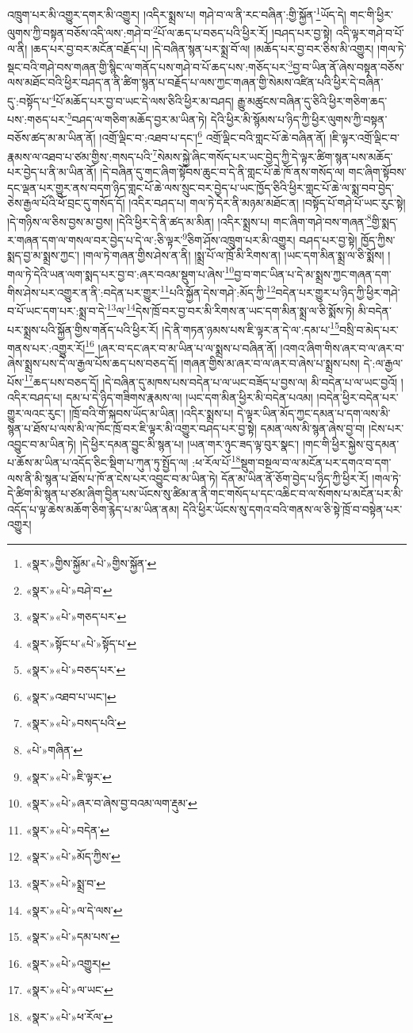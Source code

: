 འཁྲུག་པར་མི་འགྱུར་དགར་མི་འགྱུར། །འདིར་སྨྲས་པ། གཤེ་བ་ལ་ནི་རང་བཞིན་:གྱི་སྐྱོན་\footnote{«སྣར་»གྱིས་སྐྱོམ་«པེ་»གྱིས་སྐྱོན་}ཡོད་དེ། གང་གི་ཕྱིར་ལུགས་ཀྱི་བསྟན་བཅོས་འདི་ལས་:གཤེ་བ་\footnote{«སྣར་»«པེ་»བཤེ་བ་}པོ་ལ་ཆད་པ་བཅད་པའི་ཕྱིར་རོ། །བཤད་པར་བྱ་སྟེ། འདི་ལྟར་གཤེ་བ་པོ་ལ་ནི། །ཆད་པར་བྱ་བར་མངོན་བརྗོད་པ། །དེ་བཞིན་སྙན་པར་སྨྲ་བོ་ལ། །མཆོད་པར་བྱ་བར་ཅིས་མི་འགྱུར། །གལ་ཏེ་སྡང་བའི་གཤེ་བས་གཞན་གྱི་སྙིང་ལ་གནོད་པས་གཤེ་བ་པོ་ཆད་པས་:གཅོད་པར་\footnote{«སྣར་»«པེ་»གཅད་པར་}བྱ་བ་ཡིན་ནོ་ཞེས་བསྟན་བཅོས་ལས་མཐོང་བའི་ཕྱིར་བཤད་ན་ནི་ཚིག་སྙན་པ་བརྗོད་པ་ལས་ཀྱང་གཞན་གྱི་སེམས་འཛིན་པའི་ཕྱིར་དེ་བཞིན་དུ་:བསྟོད་པ་\footnote{«སྣར་»སྟོང་པ་«པེ་»སྟོད་པ་}པོ་མཆོད་པར་བྱ་བ་ཡང་དེ་ལས་ཅིའི་ཕྱིར་མ་བཤད། རྒྱུ་མཚུངས་བཞིན་དུ་ཅིའི་ཕྱིར་གཅིག་ཆད་པས་:གཅད་པར་\footnote{«སྣར་»«པེ་»བཅད་པར་}བཤད་ལ་གཅིག་མཆོད་བྱར་མ་ཡིན་ཏེ། དེའི་ཕྱིར་མི་སྙོམས་པ་ཉིད་ཀྱི་ཕྱིར་ལུགས་ཀྱི་བསྟན་བཅོས་ཚད་མ་མ་ཡིན་ནོ། །འགྲོ་ལྡིང་བ་:འཐབ་པ་དང་།\footnote{«སྣར་»འཐབ་པ་ཡང་།} འགྲོ་ལྡིང་བའི་གླང་པོ་ཆེ་བཞིན་ནོ། །ཇི་ལྟར་འགྲོ་ལྡིང་བ་རྣམས་ལ་འཐབ་པ་ཙམ་གྱིས་:གསད་པའི་\footnote{«སྣར་»«པེ་»བསད་པའི་}སེམས་སྐྱེ་ཞིང་གསོད་པར་ཡང་བྱེད་ཀྱི་དེ་ལྟར་ཚིག་སྙན་པས་མཆོད་པར་བྱེད་པ་ནི་མ་ཡིན་ནོ། །དེ་བཞིན་དུ་གང་ཞིག་སྟོབས་ཆུང་བ་དེ་ནི་གླང་པོ་ཆེ་ཁོ་ནས་གསོད་ལ། གང་ཞིག་སྟོབས་དང་ལྡན་པར་གྱུར་ནས་བདག་ཉིད་གླང་པོ་ཆེ་ལས་སྲུང་བར་བྱེད་པ་ཡང་ཁྱོད་ཅིའི་ཕྱིར་གླང་པོ་ཆེ་ལ་སྨ་བབ་བྱེད་ཅེས་རྒྱལ་པོའི་ཕོ་བྲང་དུ་གསོད་དོ། །འདིར་བཤད་པ། གལ་ཏེ་དེར་ནི་མཉམ་མཐོང་ན། །བསྟོད་པོ་གཤེ་པོ་ཡང་རུང་སྟེ། །དེ་གཉིས་ལ་ཅིས་བྱས་མ་བྱས། །དེའི་ཕྱིར་དེ་ནི་ཚད་མ་མིན། །འདིར་སྨྲས་པ། གང་ཞིག་གཤེ་བས་གཞན་\footnote{«པེ་»གཞིན་}གྱི་སྨད་ར་གཞན་དག་ལ་གསལ་བར་བྱེད་པ་དེ་ལ་:ཅི་ལྟར་\footnote{«སྣར་»«པེ་»ཇི་ལྟར་}ཅིག་ཤོས་འཁྲུག་པར་མི་འགྱུར། བཤད་པར་བྱ་སྟེ། ཁྱོད་ཀྱིས་སྨད་བྱ་མ་སྨྲས་ཀྱང་། །གལ་ཏེ་གཞན་གྱིས་ཤེས་ན་ནི། །སྨྲ་པོ་ལ་ཁྲོ་མི་རིགས་ན། །ཡང་དག་མིན་སྨྲ་ལ་ཅི་སྨོས། །གལ་ཏེ་དེའི་ཡན་ལག་སྨད་པར་བྱ་བ་:ཞར་བའམ་སྡུག་པ་ཞེས་\footnote{«སྣར་»«པེ་»ཞར་བ་ཞེས་བྱ་བའམ་ལག་རྡུམ་}བྱ་བ་གང་ཡིན་པ་དེ་མ་སྨྲས་ཀྱང་གཞན་དག་གིས་ཤེས་པར་འགྱུར་ན་ནི་:བདེན་པར་གྱུར་\footnote{«སྣར་»«པེ་»བདེན་}པའི་སྐྱོན་དེས་གཤེ་:མོད་ཀྱི་\footnote{«སྣར་»«པེ་»མོད་ཀྱིས་}བདེན་པར་གྱུར་པ་ཉིད་ཀྱི་ཕྱིར་གཤེ་བ་པོ་ཡང་དག་པར་:སྨྲ་བ་དེ་\footnote{«སྣར་»«པེ་»སྨྲ་བ་}ལ་\footnote{«སྣར་»«པེ་»ལ་དེ་ལས་}དེས་ཁྲོ་བར་བྱ་བར་མི་རིགས་ན་ཡང་དག་མིན་སྨྲ་ལ་ཅི་སྨོས་ཏེ། མི་བདེན་པར་སྨྲས་པའི་སྐྱོན་གྱིས་གནོད་པའི་ཕྱིར་རོ། །དེ་ནི་གཏན་ཉམས་པས་ཇི་ལྟར་ན་དེ་ལ་:དམ་པ་\footnote{«སྣར་»«པེ་»དམ་པས་}བསྲི་བ་མེད་པར་གནས་པར་:འགྱུར་རོ།\footnote{«སྣར་»«པེ་»འགྱུར།} །ཞར་བ་དང་ཞར་བ་མ་ཡིན་པ་ལ་སྨྲས་པ་བཞིན་ནོ། །འགའ་ཞིག་གིས་ཞར་བ་ལ་ཞར་བ་ཞེས་སྨྲས་པས་དེ་ལ་རྒྱལ་པོས་ཆད་པས་བཅད་དོ། །གཞན་གྱིས་མ་ཞར་བ་ལ་ཞར་བ་ཞེས་པ་སྨྲས་པས། དེ་:ལ་རྒྱལ་པོས་\footnote{«སྣར་»«པེ་»ལ་ཡང་}ཆད་པས་བཅད་དོ། །དེ་བཞིན་དུ་མཁས་པས་བདེན་པ་ལ་ཡང་བཟོད་པ་བྱས་ལ། མི་བདེན་པ་ལ་ཡང་བྱའོ། །འདིར་བཤད་པ། དམ་པ་དེ་ཉིད་གཟིགས་རྣམས་ལ། །ཡང་དག་མིན་ཕྱིར་མི་བདེན་པའམ། །བདེན་ཕྱིར་བདེན་པར་གྱུར་ལའང་རུང་། །ཁྲོ་བའི་གོ་སྐབས་ཡོད་མ་ཡིན། །འདིར་སྨྲས་པ། དེ་ལྟར་ཡིན་མོད་ཀྱང་དམན་པ་དག་ལས་མི་སྙན་པ་ཐོས་པ་ལས་མི་ལ་ཁོང་ཁྲོ་བར་ཇི་ལྟར་མི་འགྱུར་བཤད་པར་བྱ་སྟེ། དམན་ལས་མི་སྙན་ཞེས་བྱ་བ། །ངེས་པར་འབྱུང་བ་མ་ཡིན་ཏེ། །དེ་ཕྱིར་དམན་བྱུང་མི་སྙན་པ། །ཡན་གར་ཉུང་ཟད་ལྟ་བུར་སྣང་། །གང་གི་ཕྱིར་སྐྱེས་བུ་དམན་པ་ཆོས་མ་ཡིན་པ་འདོད་ཅིང་སྡིག་པ་ཀུན་ཏུ་སྤྱོད་ལ། :ཕ་རོལ་པོ་\footnote{«སྣར་»«པེ་»ཕ་རོལ་}སྡུག་བསྔལ་བ་ལ་མངོན་པར་དགའ་བ་དག་ལས་ནི་མི་སྙན་པ་ཐོས་པ་ཁོ་ན་ངེས་པར་འབྱུང་བ་མ་ཡིན་ཏེ། དོན་མ་ཡིན་ནོ་ཅོག་བྱེད་པ་ཉིད་ཀྱི་ཕྱིར་རོ། །གལ་ཏེ་དེ་ཚིག་མི་སྙན་པ་ཙམ་ཞིག་བྱིན་པས་ཡོངས་སུ་ཚིམ་ན་ནི་གང་གསོད་པ་དང་འཆིང་བ་ལ་སོགས་པ་མངོན་པར་མི་འདོད་པ་ལྟ་ཆེས་མཆོག་ཅིག་རྙེད་པ་མ་ཡིན་ནམ། དེའི་ཕྱིར་ཡོངས་སུ་དགའ་བའི་གནས་ལ་ཅི་སྟེ་ཁྲོ་བ་བསྟེན་པར་འགྱུར། 